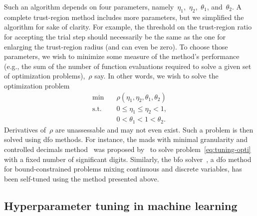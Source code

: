 Such an algorithm depends on four parameters, namely~$\eta_1$,~$\eta_2$,~$\theta_1$, and~$\theta_2$.
A complete trust-region method includes more parameters, but we simplified the algorithm for sake of clarity.
For example, the threshold on the trust-region ratio for accepting the trial step should necessarily be the same as the one for enlarging the trust-region radius (and can even be zero).
To choose those parameters, we wish to minimize some measure of the method's performance (e.g., the sum of the number of function evaluations required to solve a given set of optimization problems),~$\rho$ say.
In other words, we wish to solve the optimization problem
\begin{subequations}
    \label{eq:tuning-opti}
    \begin{align}
        \min        & \quad \rho(\eta_1, \eta_2, \theta_1, \theta_2)\\
        \text{s.t.} & \quad 0 \le \eta_1 \le \eta_2 < 1,\\
                    & \quad 0 < \theta_1 < 1 < \theta_2.
    \end{align}
\end{subequations}
Derivatives of~$\rho$ are unassessable and may not even exist.
Such a problem is then solved using \gls{dfo} methods.
For instance, the \gls{mads} with minimal granularity and controlled decimals method~\cite{Audet_Digabel_Tribes_2019} was proposed by~\citeauthor{Audet_Digabel_Tribes_2019} to solve problem~\cref{eq:tuning-opti} with a fixed number of significant digits.
Similarly, the \gls{bfo} solver~\cite{Porcelli_Toint_2017}, a \gls{dfo} method for bound-constrained problems mixing continuous and discrete variables, has been self-tuned using the method presented above.

\subsection{Hyperparameter tuning in machine learning}
\label{subsec:machine-learning}

